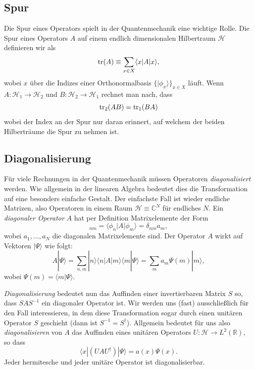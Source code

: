 \subsection{Spur}
Die Spur eines Operators spielt in der Quantenmechanik eine wichtige Rolle. Die Spur eines Operators $A$ auf einem endlich dimensionalen Hilbertraum $\mathcal{H}$ definieren wir als 
\begin{equation}
	\operatorname{tr}(A) \equiv \sum_{x\in X} \langle x|A|x\rangle,
\end{equation}
wobei $x$ über die Indizes einer Orthonormalbasis $\{|\phi_x\rangle\}_{x\in X}$ läuft. Wenn $A : \mathcal{H}_1 \rightarrow \mathcal{H}_2$ und $B : \mathcal{H}_2 \rightarrow \mathcal{H}_1$ rechnet man nach, dass
\begin{equation}
	\operatorname{tr}_2(AB) = \operatorname{tr}_1(BA)
\end{equation}
wobei der Index an der Spur nur daran erinnert, auf welchem der beiden Hilberträume die Spur zu nehmen ist.

\subsection{Diagonalisierung}
Für viele Rechnungen in der Quantenmechanik müssen Operatoren \emph{diagonalisiert} werden. Wie allgemein in der linearen Algebra bedeutet dies die Transformation auf eine besonders einfache Gestalt. Der einfachste Fall ist  wieder endliche Matrizen, also Operatoren in einem Raum $\mathcal{H}\equiv \mathbb{C}^N$ für endliches $N$. Ein \emph{diagonaler Operator} $A$ hat per Definition Matrixelemente der Form
\begin{equation}
	[A]_{nm} = \langle\phi_n|A|\phi_m\rangle = \delta_{nm} a_m,
\end{equation}
wobei $a_1, \ldots, a_N$ die diagonalen Matrixelemente sind. Der Operator $A$ wirkt auf Vektoren $|\Psi\rangle$ wie folgt:
\begin{equation}
	A|\Psi\rangle = \sum_{n,m} |n\rangle\langle n|A|m\rangle\langle m|\Psi\rangle = \sum_{m} a_{m}\Psi(m) |m\rangle,
\end{equation}
wobei $\Psi(m) = \langle m|\Psi\rangle$.  

\emph{Diagonalisierung} bedeutet nun das Auffinden einer invertierbaren Matrix $S$ so, dass $SAS^{-1}$ ein diagonaler Operator ist. Wir werden uns (fast) ausschließlich für den Fall interessieren, in dem diese Transformation sogar durch einen unitären Operator $S$ geschieht (dann ist $S^{−1} = S^\dag$). Allgemein bedeutet für uns also
\emph{diagonalisieren} von $A$ das Auffinden eines unitären Operators $U : \mathcal{H} \rightarrow L^2(\mathbb{R})$, so dass 
\begin{equation}
	\langle x|(UAU^\dag )|\Psi\rangle = a(x)\Psi(x).
\end{equation}
Jeder hermitesche und jeder unitäre Operator ist diagonalisierbar.

